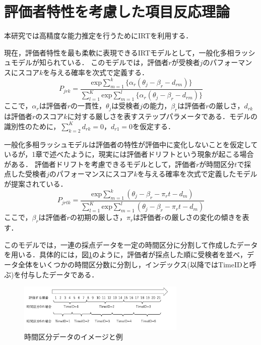 \documentclass[twocolumn,10pt]{jsarticle}
\begin{document}
\vspace{-2mm}
\section{評価者特性を考慮した項目反応理論}\label{sec:features}
\vspace{-1mm}
本研究では高精度な能力推定を行うためにIRTを利用する．

現在，評価者特性を最も柔軟に表現できるIRTモデルとして，一般化多相ラッシュモデルが知られている\cite{g-MFRM}．
このモデルでは，評価者$r$が受検者$j$のパフォーマンスにスコア$k$を与える確率を次式で定義する．
\begin{equation}
  P_{jrk}=\frac{\mathrm{exp}\sum_{m=1}^{k}\{\alpha_r(\theta_{j}-\beta_{r}-d_{rm})\}}{\sum_{l=1}^{K}\mathrm{exp}\sum_{m=1}^{l}\{\alpha_r(\theta_{j}-\beta_{r}-d_{rm})\}}
\end{equation}
ここで，$\alpha_r$は評価者$r$の一貫性，$\theta_j$は受検者$j$の能力，$\beta_r$は評価者$r$の厳しさ，$d_{rk}$は評価者$r$のスコア$k$に対する厳しさを表すステップパラメータである．モデルの識別性のために，$\sum^{K}_{k=2}{d_{rk}}=0$，$d_{r1}=0$を仮定する．

一般化多相ラッシュモデルは評価者の特性が評価中に変化しないことを仮定しているが，1章で述べたように，現実には評価者ドリフトという現象が起こる場合がある．
評価者ドリフトを考慮できるモデルとして，評価者$r$が時間区分$t$で採点した受検者$j$のパフォーマンスにスコア$k$を与える確率を次式で定義したモデルが提案されている．
\begin{equation}
  P_{jrtk}=\frac{\mathrm{exp}\sum_{m=1}^{k}(\theta_{j}-\beta_{r} - \pi_{r}t-d_{m})}{\sum_{l=1}^{K}\mathrm{exp}\sum_{m=1}^{l}(\theta_{j}-\beta_{r} - \pi_{r}t-d_{m})}
\end{equation}
ここで，$\beta_{r}$は評価者$r$の初期の厳しさ，$\pi_{r}$は評価者$r$の厳しさの変化の傾きを表す．

このモデルでは，一連の採点データを一定の時間区分に分割して作成したデータを用いる．具体的には，図\ref{timeid}のように，評価者が採点した順に受検者を並べ，データ全体をいくつかの時間区分数に分割し，インデックス(以降ではTimeIDと呼ぶ)を付与したデータである．

\begin{figure}[t]
  \centering
  \includegraphics[width=8cm]{img/timeid.png}
  \caption{時間区分データのイメージと例}
  \label{timeid}
\end{figure}
\end{document}
